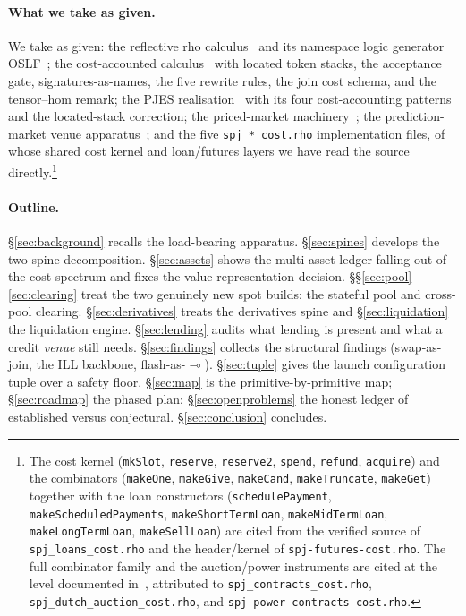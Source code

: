 \documentclass[11pt]{article}
\theoremstyle{definition}
\newcommand{\lolli}{\ensuremath{\multimap}}
\begin{document}
\paragraph{What we take as given.}
We take as given: the reflective rho calculus~\cite{rho} and its namespace logic
generator OSLF~\cite{oslf}; the cost-accounted calculus~\cite{cost} with located token stacks, the
acceptance gate, signatures-as-names, the five rewrite rules, the join cost schema, and the
tensor--hom remark; the PJES realisation~\cite{finrho} with its four cost-accounting patterns and
the located-stack correction; the priced-market machinery~\cite{ppf}; the prediction-market venue
apparatus~\cite{predmkt}; and the five \texttt{spj\_*\_cost.rho} implementation files, of whose
shared cost kernel and loan/futures layers we have read the source directly.\footnote{The cost
kernel (\texttt{mkSlot}, \texttt{reserve}, \texttt{reserve2}, \texttt{spend}, \texttt{refund},
\texttt{acquire}) and the combinators (\texttt{makeOne}, \texttt{makeGive}, \texttt{makeCand},
\texttt{makeTruncate}, \texttt{makeGet}) together with the loan constructors
(\texttt{schedulePayment}, \texttt{makeScheduledPayments}, \texttt{makeShortTermLoan},
\texttt{makeMidTermLoan}, \texttt{makeLongTermLoan}, \texttt{makeSellLoan}) are cited from the
verified source of \texttt{spj\_loans\_cost.rho} and the header/kernel of
\texttt{spj-futures-cost.rho}. The full combinator family and the auction/power instruments are
cited at the level documented in~\cite[\S2.2,\S4]{finrho}, attributed to
\texttt{spj\_contracts\_cost.rho}, \texttt{spj\_dutch\_auction\_cost.rho}, and
\texttt{spj-power-contracts-cost.rho}.}

\paragraph{Outline.}
\S\ref{sec:background} recalls the load-bearing apparatus. \S\ref{sec:spines} develops the
two-spine decomposition. \S\ref{sec:assets} shows the multi-asset ledger falling out of the cost
spectrum and fixes the value-representation decision. \S\S\ref{sec:pool}--\ref{sec:clearing} treat
the two genuinely new spot builds: the stateful pool and cross-pool clearing.
\S\ref{sec:derivatives} treats the derivatives spine and \S\ref{sec:liquidation} the liquidation
engine. \S\ref{sec:lending} audits what lending is present and what a credit \emph{venue} still
needs. \S\ref{sec:findings} collects the structural findings (swap-as-join, the ILL backbone,
flash-as-$\lolli$). \S\ref{sec:tuple} gives the launch configuration tuple over a safety floor.
\S\ref{sec:map} is the primitive-by-primitive map; \S\ref{sec:roadmap} the phased plan;
\S\ref{sec:openproblems} the honest ledger of established versus conjectural. \S\ref{sec:conclusion}
concludes.
\end{document}
